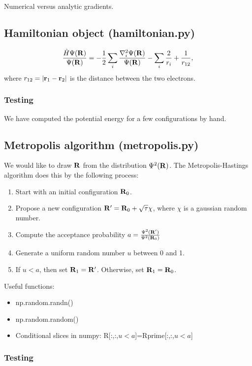 \documentclass[12pt]{article}
\newcommand{\bR}{{\bf R}}
\newcommand{\br}{{\bf r}}
\begin{document}
Numerical versus analytic gradients.

\subsection{Hamiltonian object (hamiltonian.py)}

\begin{equation}
\frac{\hat{H}\Psi(\bR)}{\Psi(\bR) } = -\frac{1}{2} \sum_i \frac{\nabla_i^2 \Psi(\bR)}{\Psi(\bR)} - \sum_i \frac{2}{r_i} + \frac{1}{r_{12}},
\end{equation}
where $r_{12}=|\br_1-\br_2|$ is the distance between the two electrons.

\subsubsection{Testing}

We have computed the potential energy for a few configurations by hand. 

\subsection{Metropolis algorithm (metropolis.py)}

We would like to draw $\bR$ from the distribution $\Psi^2(\bR)$. 
The Metropolis-Hastings algorithm does this by the following process:
\begin{enumerate}
\item Start with an initial configuration $\bR_0$. 	
\item Propose a new configuration $\bR'=\bR_0 + \sqrt{\tau} \chi$, where $\chi$ is a gaussian random number.
\item Compute the acceptance probability $a=\frac{\Psi^2(\bR')}{\Psi^2(\bR_0)}$
\item Generate a uniform random number $u$ between 0 and 1. 
\item If $u < a$, then set $\bR_1=\bR'$. Otherwise, set $\bR_1=\bR_0$.
\end{enumerate}

Useful functions: 
\begin{itemize}
\item np.random.randn()
\item np.random.random()
\item Conditional slices in numpy: R[:,:,$u<a$]=Rprime[:,:,$u<a$]
\end{itemize}


\subsubsection{Testing}
\end{document}
